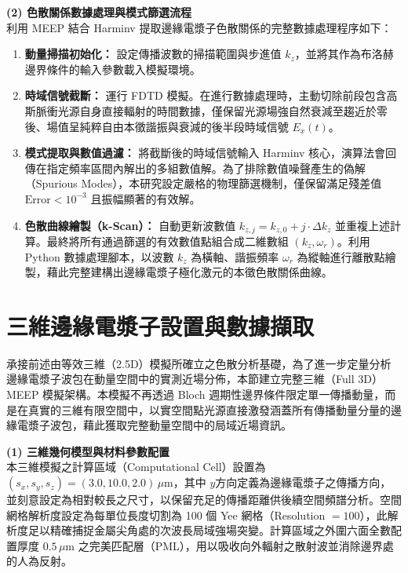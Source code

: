 \noindent \textbf{(2) 色散關係數據處理與模式篩選流程} \\
利用 MEEP 結合 Harminv 提取邊緣電漿子色散關係的完整數據處理程序如下：
\begin{enumerate}
	\item \textbf{動量掃描初始化：} 設定傳播波數的掃描範圍與步進值 $k_z$，並將其作為布洛赫邊界條件的輸入參數載入模擬環境。
    \item \textbf{時域信號截斷：} 運行 FDTD 模擬。在進行數據處理時，主動切除前段包含高斯脈衝光源自身直接輻射的時間數據，僅保留光源場強自然衰減至趨近於零後、場值呈純粹自由本徵諧振與衰減的後半段時域信號 $E_x(t)$。
	\item \textbf{模式提取與數值過濾：} 將截斷後的時域信號輸入 Harminv 核心，演算法會回傳在指定頻率區間內解出的多組數值解。為了排除數值噪聲產生的偽解（Spurious Modes），本研究設定嚴格的物理篩選機制，僅保留滿足殘差值 $\text{Error} < 10^{-3}$ 且振幅顯著的有效解。
	\item \textbf{色散曲線繪製（k-Scan）：} 自動更新波數值 $k_{z,j} = k_{z,0} + j \cdot \Delta k_z$ 並重複上述計算。最終將所有通過篩選的有效數值點組合成二維數組 $(k_z, \omega_r)$。利用 Python 數據處理腳本，以波數 $k_z$ 為橫軸、諧振頻率 $\omega_r$ 為縱軸進行離散點繪製，藉此完整建構出邊緣電漿子極化激元的本徵色散關係曲線。
\end{enumerate}


\section{三維邊緣電漿子設置與數據擷取}
\label{subsec:3D_EP_setup}

承接前述由等效三維（2.5D）模擬所確立之色散分析基礎，為了進一步定量分析邊緣電漿子波包在動量空間中的實測近場分佈，本節建立完整三維（Full 3D）MEEP 模擬架構。本模擬不再透過 Bloch 週期性邊界條件限定單一傳播動量，而是在真實的三維有限空間中，以實空間點光源直接激發涵蓋所有傳播動量分量的邊緣電漿子波包，藉此獲取完整動量空間中的局域近場資訊。

\noindent\textbf{(1) 三維幾何模型與材料參數配置} \\
本三維模擬之計算區域（Computational Cell）設置為 $(s_x, s_y, s_z) = (3.0, 10.0, 2.0)\,\mu\mathrm{m}$，其中 $y$方向定義為邊緣電漿子之傳播方向，並刻意設定為相對較長之尺寸，以保留充足的傳播距離供後續空間頻譜分析。空間網格解析度設定為每單位長度切割為 100 個 Yee 網格（Resolution $= 100$），此解析度足以精確捕捉金屬尖角處的次波長局域強場突變。計算區域之外圍六面全數配置厚度 $0.5\,\mu\mathrm{m}$ 之完美匹配層（PML），用以吸收向外輻射之散射波並消除邊界處的人為反射。

